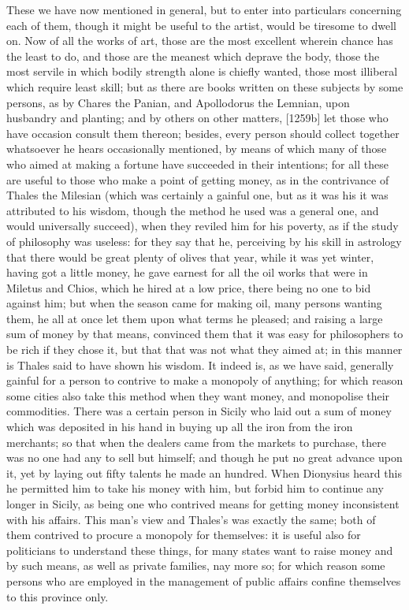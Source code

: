 These we have now mentioned in general, but to enter into particulars
concerning each of them, though it might be useful to the artist, would be
tiresome to dwell on. Now of all the works of art, those are the most
excellent wherein chance has the least to do, and those are the meanest
which deprave the body, those the most servile in which bodily strength
alone is chiefly wanted, those most illiberal which require least skill;
but as there are books written on these subjects by some persons, as by
Chares the Panian, and Apollodorus the Lemnian, upon husbandry and
planting; and by others on other matters, [1259b] let those who have
occasion consult them thereon; besides, every person should collect
together whatsoever he hears occasionally mentioned, by means of which
many of those who aimed at making a fortune have succeeded in their
intentions; for all these are useful to those who make a point of getting
money, as in the contrivance of Thales the Milesian (which was certainly a
gainful one, but as it was his it was attributed to his wisdom, though the
method he used was a general one, and would universally succeed), when
they reviled him for his poverty, as if the study of philosophy was
useless: for they say that he, perceiving by his skill in astrology that
there would be great plenty of olives that year, while it was yet winter,
having got a little money, he gave earnest for all the oil works that were
in Miletus and Chios, which he hired at a low price, there being no one to
bid against him; but when the season came for making oil, many persons
wanting them, he all at once let them upon what terms he pleased; and
raising a large sum of money by that means, convinced them that it was
easy for philosophers to be rich if they chose it, but that that was not
what they aimed at; in this manner is Thales said to have shown his
wisdom. It indeed is, as we have said, generally gainful for a person to
contrive to make a monopoly of anything; for which reason some cities also
take this method when they want money, and monopolise their commodities.
There was a certain person in Sicily who laid out a sum of money which was
deposited in his hand in buying up all the iron from the iron merchants;
so that when the dealers came from the markets to purchase, there was no
one had any to sell but himself; and though he put no great advance upon
it, yet by laying out fifty talents he made an hundred. When Dionysius
heard this he permitted him to take his money with him, but forbid him to
continue any longer in Sicily, as being one who contrived means for
getting money inconsistent with his affairs. This man's view and Thales's
was exactly the same; both of them contrived to procure a monopoly for
themselves: it is useful also for politicians to understand these things,
for many states want to raise money and by such means, as well as private
families, nay more so; for which reason some persons who are employed in
the management of public affairs confine themselves to this province only.

